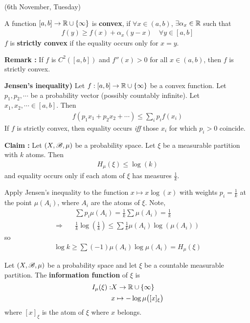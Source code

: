 \documentclass[12pt,a4paper]{report}
\newenvironment{proof}
{\begin{changemargin}{1cm}{0.5cm} 
	}%
	{\end{changemargin}
}
\begin{document}
(6th November, Tuesday)

 A function $[a,b] \rightarrow \mathbb{R} \cup \{ \infty \}$ is \textbf{convex}, if $\forall x \in (a,b)$, $\exists \alpha_x \in \mathbb{R}$ such that
\begin{align*}
f(y) \geq f(x) + \alpha_x (y-x) \quad \forall y \in [a,b]
\end{align*}
$f$ is \textbf{strictly convex} if the equality occurs only for $x=y$. 
\s

\textbf{Remark :} If $f$ is $C^2([a,b])$ and $f''(x) >0$ for all $x\in (a,b)$, then $f$ is strictly convex.
\s

\textbf{Jensen's inequality)} Let $f:[a,b] \rightarrow \mathbb{R} \cup \{\infty\}$ be a convex function. Let $p_1, p_2, \cdots$ be a probability vector (possibly countably infinite). Let $x_1, x_2, \cdots \in [a,b]$. Then
\begin{align*}
f(p_1 x_1 + p_2 x_2 + \cdots) \leq \sum_i p_i f(x_i)
\end{align*}
If $f$ is strictly convex, then equality occurs \emph{iff} those $x_i$ for which $p_i >0$ coincide.
\s

\textbf{Claim :} Let $(X,\mathscr{B}, \mu)$ be a probability space. Let $\xi$ be a measurable partition with $k$ atoms. Then
\begin{align*}
H_{\mu}(\xi) \leq \log (k)
\end{align*}
and equality occurs only if each atom of $\xi$ has measures $\frac{1}{k}$.
\begin{proof}
\pf Apply Jensen's inequality to the function $x\mapsto x \log (x)$ with weights $p_i = \frac{1}{k}$ at the point $\mu(A_i)$, where $A_i$ are the atoms of $\xi$. Note,
\begin{align*}
& \sum p_i \mu(A_i) = \frac{1}{k} \sum \mu(A_i) = \frac{1}{k} \\
\Rightarrow \quad & \frac{1}{k} \log (\frac{1}{k}) \leq \sum \frac{1}{k} \mu(A_i) \log (\mu(A_i))
\end{align*}
so
\begin{align*}
\log k \geq \sum (-1) \mu(A_i) \log \mu(A_i) = H_{\mu}(\xi)
\end{align*}

\eop
\end{proof}

\s

 Let $(X, \mathscr{B}, \mu)$ be a probability space and let $\xi$ be a countable measurable partition. The \textbf{information function} of $\xi$ is
\begin{align*}
I_{\mu} (\xi) : & X \rightarrow \mathbb{R} \cup \{\infty \} \\
& x\mapsto -\log \mu \big( [x]_{\xi} \big)
\end{align*}
where $[x]_{\xi}$ is the atom of $\xi$ where $x$ belongs.
\end{document}
